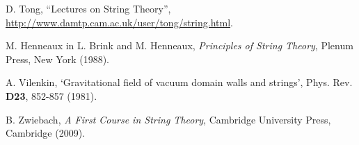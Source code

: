 \documentclass{revtex4}
\begin{document}

\begin{thebibliography}{99}

 D. Tong, ``Lectures on String Theory'', \url{http://www.damtp.cam.ac.uk/user/tong/string.html}.

  M. Henneaux in L. Brink and M. Henneaux, {\it Principles of String Theory}, Plenum Press, New York (1988).

 A. Vilenkin, `Gravitational field of vacuum domain walls and strings', Phys. Rev. {\bf D23}, 852-857 (1981).

 B. Zwiebach, {\it A First Course in String Theory}, Cambridge University Press, Cambridge (2009).

\end{thebibliography}
\end{document}
